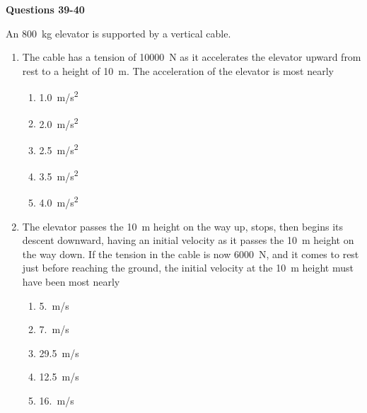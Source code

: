 \documentclass{../../oss-apphys}
\begin{document}
\begin{multicols}{2}
  \textbf{Questions 39-40}

  An \SI{800}{\kilo\gram} elevator is supported by a vertical cable.
  \begin{center}
  \end{center}
  \begin{enumerate}[resume,leftmargin=18pt]
  \item The cable has a tension of \SI{10000}{\newton} as it accelerates the
    elevator upward from rest to a height of \SI{10}{\metre}. The acceleration
    of the elevator is most nearly
    \begin{enumerate}[noitemsep,topsep=0pt,leftmargin=18pt,label=(\Alph*)]
    \item\SI{1.0}{m/s^2}
    \item\SI{2.0}{m/s^2}
    \item\SI{2.5}{m/s^2}
    \item\SI{3.5}{m/s^2}
    \item\SI{4.0}{m/s^2}
    \end{enumerate}
    
  \item The elevator passes the \SI{10}{\metre} height on the way up, stops,
    then begins its descent downward, having an initial velocity as it passes
    the \SI{10}{\metre} height on the way down. If the tension in the cable is
    now \SI{6000}{\newton}, and it comes to rest just before reaching the
    ground, the initial velocity at the \SI{10}{\metre} height must have been
    most nearly
    \begin{enumerate}[noitemsep,topsep=0pt,leftmargin=18pt,label=(\Alph*)]
    \item\SI{5.}{m/s}
    \item\SI{7.}{m/s}
    \item\SI{29.5}{m/s}
    \item\SI{12.5}{m/s}
    \item\SI{16.}{m/s}
    \end{enumerate}

  \end{enumerate}
  \columnbreak
  

\end{multicols}
\end{document}
